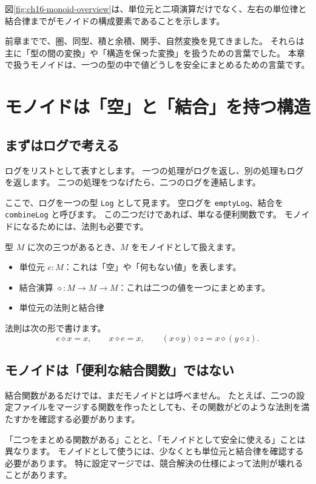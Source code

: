 図\ref{fig:ch16-monoid-overview}は、単位元と二項演算だけでなく、左右の単位律と結合律までがモノイドの構成要素であることを示します。


前章までで、圏、同型、積と余積、関手、自然変換を見てきました。
それらは主に「型の間の変換」や「構造を保った変換」を扱うための言葉でした。
本章で扱うモノイドは、一つの型の中で値どうしを安全にまとめるための言葉です。

\section{モノイドは「空」と「結合」を持つ構造}

\subsection{まずはログで考える}

ログをリストとして表すとします。
一つの処理がログを返し、別の処理もログを返します。
二つの処理をつなげたら、二つのログを連結します。

ここで、ログを一つの型 \texttt{Log} として見ます。
空ログを \texttt{emptyLog}、結合を \texttt{combineLog} と呼びます。
この二つだけであれば、単なる便利関数です。
モノイドになるためには、法則も必要です。

型 \(M\) に次の三つがあるとき、\(M\) をモノイドとして扱えます。
\begin{itemize}
\item 単位元 \(e : M\)：これは「空」や「何もない値」を表します。
\item 結合演算 \(\diamond : M \to M \to M\)：これは二つの値を一つにまとめます。
\item 単位元の法則と結合律
\end{itemize}
法則は次の形で書けます。
\[
  e \diamond x = x, \qquad
  x \diamond e = x, \qquad
  (x \diamond y) \diamond z = x \diamond (y \diamond z).
\]

\subsection{モノイドは「便利な結合関数」ではない}

結合関数があるだけでは、まだモノイドとは呼べません。
たとえば、二つの設定ファイルをマージする関数を作ったとしても、その関数がどのような法則を満たすかを確認する必要があります。

「二つをまとめる関数がある」ことと、「モノイドとして安全に使える」ことは異なります。
モノイドとして使うには、少なくとも単位元と結合律を確認する必要があります。
特に設定マージでは、競合解決の仕様によって法則が壊れることがあります。

